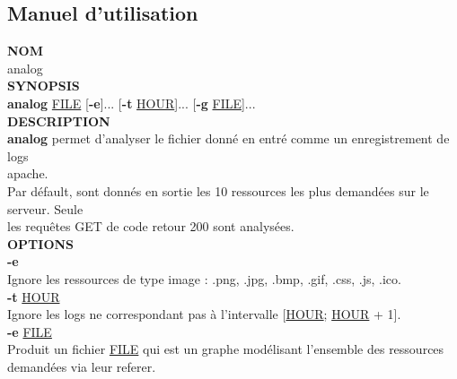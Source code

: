 \documentclass[a4paper]{article}
\begin{document}
\begin{appendix}
\section{Manuel d'utilisation}\noindent
\noindent
\textbf{\color{BurntOrange}NOM}\\
\indent \indent analog\\
\newline
\textbf{\color{BurntOrange}SYNOPSIS}\\
\indent \indent \textbf{\color{BurntOrange}analog} {\color{OliveGreen}\underline{FILE}} [\textbf{\color{BurntOrange}-e}]... [\textbf{\color{BurntOrange}-t} {\color{OliveGreen}\underline{HOUR}}]... [\textbf{\color{BurntOrange}-g} {\color{OliveGreen}\underline{FILE}}]...\\
\newline
\textbf{\color{BurntOrange}DESCRIPTION}\\
\indent \indent \textbf{\color{BurntOrange}analog} permet d'analyser le fichier donné en entré comme un enregistrement de logs\\
\indent \indent apache.\\
\indent \indent Par défault, sont donnés en sortie les 10 ressources les plus demandées sur le serveur. Seule\\
\indent \indent les requêtes GET de code retour 200 sont analysées.\\
\newline
\textbf{\color{BurntOrange}OPTIONS}\\
\indent \indent \textbf{\color{BurntOrange}-e} \\
\indent \indent \indent \indent Ignore les ressources de type image : .png, .jpg, .bmp, .gif, .css, .js, .ico.\\
\newline
\indent \indent \textbf{\color{BurntOrange}-t} {\color{OliveGreen}\underline{HOUR}}\\
\indent \indent \indent \indent Ignore les logs ne correspondant pas à l'intervalle [{\color{OliveGreen}\underline{HOUR}}; {\color{OliveGreen}\underline{HOUR}} + 1].\\
\newline
\indent \indent \textbf{\color{BurntOrange}-e} {\color{OliveGreen}\underline{FILE}}\\
\indent \indent \indent \indent Produit un fichier {\color{OliveGreen}\underline{FILE}} qui est un graphe modélisant l'ensemble des ressources\\
\indent \indent \indent \indent demandées via leur referer.\\
\newline
\clearpage


\end{appendix}
\end{document}
